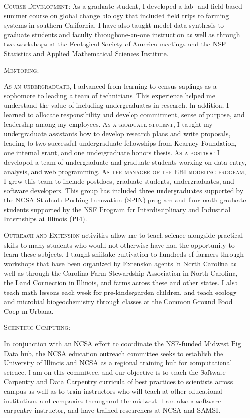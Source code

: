 \documentclass[english]{tufte-handout}
\providecommand\mynewthought[1]{%
   \addvspace{0.5em}%
   \noindent\hspace{-0.5em}\textsc{#1} %
}
\begin{document}
\begin{fullwidth}
\mynewthought{Course Development:} As a graduate student, I developed a lab- and field-based summer course on global change biology that included field trips to farming systems in southern California.
I have also taught model-data synthesis to graduate students and faculty throughone-on-one instruction as well as through two workshops at the Ecological Society of America meetings and the NSF Statistics and Applied Mathematical Sciences Institute.

\mynewthought{Mentoring:} 
\textsc{As an undergraduate}, I advanced from learning to census saplings as a sophomore to leading a team of technicians.
This experience helped me understand the value of including undergraduates in research. 
In addition, I learned to allocate responsibility and develop commitment, sense of purpose, and leadership among my employees.
\textsc{As a graduate student}, I taught my undergraduate assistants how to develop research plans and write proposals, leading to two successful undergraduate fellowships from Kearney Foundation, one internal grant, and one undergraduate honors thesis.
\textsc{As a postdoc} I developed a team of undergraduate and graduate students working on data entry, analysis, and web programming.
\textsc{As the manager of the EBI modeling program}, I grew this team to include postdocs, graduate students, undergraduates, and software developers.
This group has included three undergraduates supported by the NCSA Students Pushing Innovation (SPIN) program and four math graduate students supported by the NSF Program for Interdisciplinary and Industrial Internships at Illinois (PI4).

\mynewthought{Outreach and Extension} activities allow me to teach science alongside practical skills to many students who would not otherwise have had the opportunity to learn these subjects.
I taught shiitake cultivation to hundreds of farmers through workshops that have been organized by Extension agents in North Carolina as well as through the Carolina Farm Stewardship Association in North Carolina, the Land Connection in Illinois, and farms across these and other states.
I also teach math lessons each week for pre-kindergarden children, and teach ecology and microbial biogeochemistry through classes at the Common Ground Food Coop in Urbana. 

\mynewthought{Scientific Computing:}
 In conjunction with an NCSA effort to coordinate the NSF-funded Midwest Big Data hub, the NCSA education outreach committee seeks to establish the University of Illinois and NCSA as a regional training hub for computational science. 
 I am on this committee, and our objective is to teach the Software Carpentry and Data Carpentry curricula of best practices to scientists across campus as well as to train instructors who will teach at other educational institutions and companies throughout the midwest.
 I am also a software carpentry instructor, and have trained researchers at NCSA and SAMSI.


\end{fullwidth}
\end{document}
